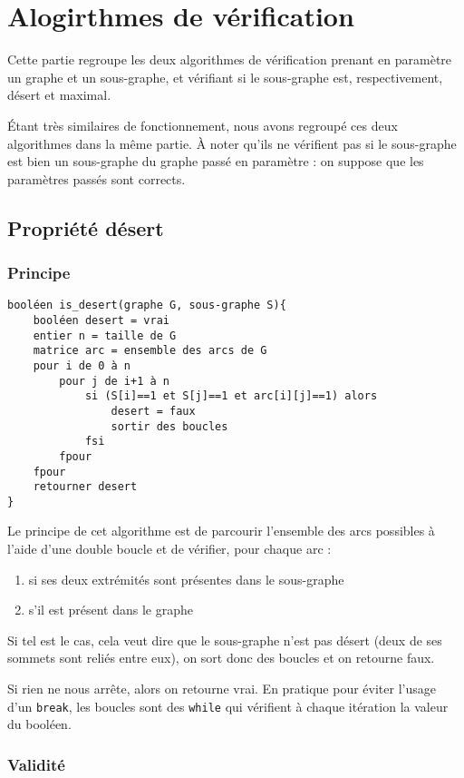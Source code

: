 \section{Alogirthmes de vérification}

Cette partie regroupe les deux algorithmes de vérification prenant en paramètre un graphe et un sous-graphe, et vérifiant si le sous-graphe est, respectivement, désert et maximal. 

Étant très similaires de fonctionnement, nous avons regroupé ces deux algorithmes dans la même partie. À noter qu'ils ne vérifient pas si le sous-graphe est bien un sous-graphe du graphe passé en paramètre : on suppose que les paramètres passés sont corrects.

\subsection{Propriété \og désert \fg}

\subsubsection{Principe}

\begin{verbatim}
booléen is_desert(graphe G, sous-graphe S){
    booléen desert = vrai
    entier n = taille de G
    matrice arc = ensemble des arcs de G
    pour i de 0 à n
        pour j de i+1 à n
            si (S[i]==1 et S[j]==1 et arc[i][j]==1) alors 
                desert = faux
                sortir des boucles
            fsi
        fpour
    fpour
    retourner desert
}
\end{verbatim}
Le principe de cet algorithme est de parcourir l'ensemble des arcs possibles à l'aide d'une double boucle et de vérifier, pour chaque arc :
\begin{enumerate}
	\item si ses deux extrémités sont présentes dans le sous-graphe
	\item s'il est présent dans le graphe
\end{enumerate}
Si tel est  le cas, cela veut dire que le sous-graphe n'est pas désert (deux de ses sommets sont reliés entre eux), on sort donc des boucles et on retourne faux.

Si rien ne nous arrête, alors on retourne vrai. En pratique pour éviter l'usage d'un \verb|break|, les boucles sont des \verb|while| qui vérifient à chaque itération la valeur du booléen.

\subsubsection{Validité}

